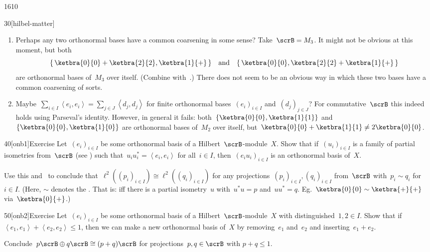 \begin{parsec}{1610}
\begin{point}{30}[hilbel-matter]
\begin{enumerate}
\item
Perhaps any two orthonormal bases have a common coarsening in some sense?
Take~$\scrB = M_3$.
It might not be obvious at this moment, but both
\begin{equation*}
    \{\,\ketbra{0}{0} + \ketbra{2}{2}, \ketbra{1}{+}\,\}
    \quad \text{and} \quad
    \{\,\ketbra{0}{0}, \ketbra{2}{2}+ \ketbra{1}{+}\,\}
\end{equation*}
are orthonormal bases of~$M_3$ over itself.
(Combine  with~.)
There does not seem to be an obvious way in which these
    two bases have a common coarsening of sorts.

\item
Maybe~$\sum_{i\in I} \left<e_i,e_i\right> = \sum_{j\in J} \left<d_j,d_j\right>$
    for finite orthonormal bases~$(e_i)_{i \in I}$ and~$(d_j)_{j \in J}$?
For commutative~$\scrB$ this indeed holds using Parseval's identity.
However, in general it fails:
        both~$\{\ketbra{0}{0}, \ketbra{1}{1}\}$ and
        $\{\ketbra{0}{0}, \ketbra{1}{0} \}$
        are orthonormal bases of~$M_2$ over itself,
    but~$\ketbra{0}{0}+ \ketbra{1}{1} \neq 2 \ketbra{0}{0}$.
\end{enumerate}
\spacingfix{}
\end{point}
\begin{point}{40}[onb1]{Exercise}%
Let~$(e_i)_{ i \in I}$ be some orthonormal basis of a Hilbert~$\scrB$-module~$X$.
Show that if~$(u_i)_{i \in I}$
    is a family of partial isometries
    from~$\scrB$
    (see )
    such that~$u_iu_i^* = \left<e_i,e_i\right>$
    for all~$i \in I$,
    then~$(e_iu_i)_{i \in I}$
    is an orthonormal basis of~$X$.

Use this and~ to conclude
    that~$\ell^2((p_i)_{i \in I}) \cong \ell^2((q_i)_{i \in I})$
    for any projections~$(p_i)_{i\in I}, (q_i)_{i\in I} $
    from~$\scrB$
    with~$p_i \sim q_i$ for~$i \in I$.
    (Here, $\sim$ denotes the .
    That is:  iff there is a partial isometry~$u$
    with~$u^*u = p$ and~$uu^*=q$.
    Eg.~$\ketbra{0}{0} \sim \ketbra{+}{+}$
        via~$\ketbra{0}{+}$.)
\end{point}

\begin{point}{50}[onb2]{Exercise}%
Let~$(e_i)_{ i \in I}$ be some orthonormal basis of a Hilbert~$\scrB$-module~$X$
    with distinguished~$1,2 \in I$.
Show that if~$\left<e_1,e_1\right> + \left<e_2,e_2\right> \leq 1$,
    then we can make a new orthonormal basis of~$X$ by  removing~$e_1$ and~$e_2$
        and inserting~$e_1 + e_2$.

Conclude~$p \scrB \oplus q \scrB \cong (p+q) \scrB$
    for projections~$p,q \in \scrB$ with $p+q \leq 1$.
\end{point}
\end{parsec}
